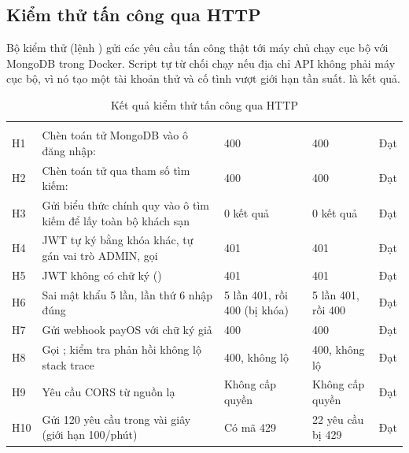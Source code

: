 \subsection{Kiểm thử tấn công qua HTTP}

Bộ kiểm thử  (lệnh ) gửi các yêu cầu tấn công thật tới máy chủ chạy cục bộ với MongoDB trong Docker. Script tự từ chối chạy nếu địa chỉ API không phải máy cục bộ, vì nó tạo một tài khoản thử và cố tình vượt giới hạn tần suất.  là kết quả.

\begin{rtable}
\begin{longtable}{|C{1.0cm}|L{6.9cm}|L{3.0cm}|L{2.4cm}|C{1.1cm}|}
\caption{Kết quả kiểm thử tấn công qua HTTP}\label{tab:security-http}\\
\hline
{} &  &  &  &  \\ \hline
\endfirsthead
\hline
{} &  &  &  &  \\ \hline
\endhead
H1 & Chèn toán tử MongoDB vào ô đăng nhập:  & 400 & 400 & Đạt \\ \hline
H2 & Chèn toán tử qua tham số tìm kiếm:  & 400 & 400 & Đạt \\ \hline
H3 & Gửi biểu thức chính quy  vào ô tìm kiếm để lấy toàn bộ khách sạn & 0 kết quả & 0 kết quả & Đạt \\ \hline
H4 & JWT tự ký bằng khóa khác, tự gán vai trò ADMIN, gọi  & 401 & 401 & Đạt \\ \hline
H5 & JWT không có chữ ký () & 401 & 401 & Đạt \\ \hline
H6 & Sai mật khẩu 5 lần, lần thứ 6 nhập đúng & 5 lần 401, rồi 400 (bị khóa) & 5 lần 401, rồi 400 & Đạt \\ \hline
H7 & Gửi webhook payOS với chữ ký giả & 400 & 400 & Đạt \\ \hline
H8 & Gọi ; kiểm tra phản hồi không lộ stack trace & 400, không lộ & 400, không lộ & Đạt \\ \hline
H9 & Yêu cầu CORS từ nguồn lạ  & Không cấp quyền & Không cấp quyền & Đạt \\ \hline
H10 & Gửi 120 yêu cầu trong vài giây (giới hạn 100/phút) & Có mã 429 & 22 yêu cầu bị 429 & Đạt \\ \hline
\end{longtable}
\end{rtable}


